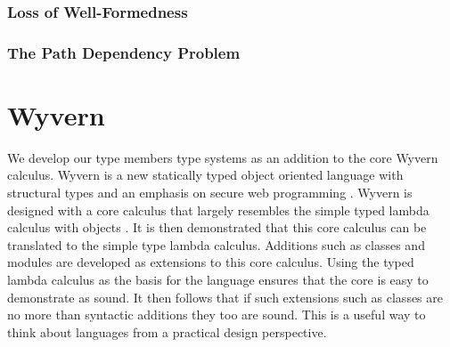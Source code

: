 \documentclass[11pt
              , a4paper
              , twoside
              , openright
              ]{report}
\numberwithin{case}{theorem}
\numberwithin{subcase}{case}
\begin{document}
\subsubsection{Loss of Well-Formedness}

\subsubsection{The Path Dependency Problem}







\section{Wyvern}\label{s:wyvern}
We develop our type members type systems as an addition to the core Wyvern calculus. Wyvern is a new statically typed object oriented language with structural types and an emphasis on secure web programming \cite{wyvern2016}. Wyvern is designed with a core calculus that largely resembles the simple typed lambda calculus with objects \cite{Nistor:2013:WST:2489828.2489830}. It is then demonstrated that this core calculus can be translated to the simple type lambda calculus. Additions such as classes and modules are developed as extensions to this core calculus. Using the typed lambda calculus as the basis for the language ensures that the core is easy to demonstrate as sound. It then follows that if such extensions such as classes are no more than syntactic additions they too are sound. This is a useful way to think about languages from a practical design perspective.
\end{document}

